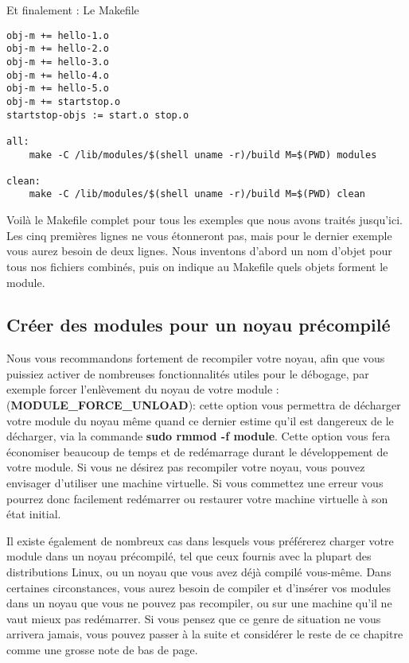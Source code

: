 \documentclass[11pt]{article}
\begin{document}
Et finalement : Le Makefile

\begin{verbatim}
obj-m += hello-1.o
obj-m += hello-2.o
obj-m += hello-3.o
obj-m += hello-4.o
obj-m += hello-5.o
obj-m += startstop.o
startstop-objs := start.o stop.o

all:
    make -C /lib/modules/$(shell uname -r)/build M=$(PWD) modules

clean:
    make -C /lib/modules/$(shell uname -r)/build M=$(PWD) clean
\end{verbatim}

Voilà le Makefile complet pour tous les exemples que nous avons traités jusqu'ici. Les cinq premières lignes ne vous étonneront pas, mais pour le dernier exemple vous aurez besoin de deux lignes. Nous inventons d'abord un nom d'objet pour tous nos fichiers combinés, puis on indique au Makefile quels objets forment le module.

\subsection*{Créer des modules pour un noyau précompilé}
\label{sec-4-7}

Nous vous recommandons fortement de recompiler votre noyau, afin que vous puissiez activer de nombreuses fonctionnalités utiles pour le débogage, par exemple forcer l'enlèvement du noyau de votre module : (\textbf{MODULE\_FORCE\_UNLOAD}): cette option vous permettra de décharger votre module du noyau même quand ce dernier estime qu'il est dangereux de le décharger, via la commande \textbf{sudo rmmod -f module}. Cette option vous fera économiser beaucoup de temps et de redémarrage durant le développement de votre module. Si vous ne désirez pas recompiler votre noyau, vous pouvez envisager d'utiliser une machine virtuelle. Si vous commettez une erreur vous pourrez donc facilement redémarrer ou restaurer votre machine virtuelle à son état initial.

Il existe également de nombreux cas dans lesquels vous préférerez charger votre module dans un noyau précompilé, tel que ceux fournis avec la plupart des distributions Linux, ou un noyau que vous avez déjà compilé vous-même. Dans certaines circonstances, vous aurez besoin de compiler et d'insérer vos modules dans un noyau que vous ne pouvez pas recompiler, ou sur une machine qu'il ne vaut mieux pas redémarrer. Si vous pensez que ce genre de situation ne vous arrivera jamais, vous pouvez passer à la suite et considérer le reste de ce chapitre comme une grosse note de bas de page.
\end{document}
